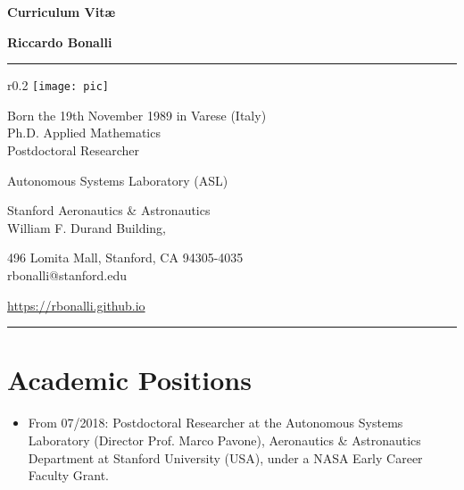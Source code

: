 \documentclass[a4paper,12pt]{article}
\begin{document}
\begingroup
\begin{center}
\LARGE \textbf{Curriculum Vit\ae}
\end{center}
\endgroup

\vspace{5pt}

\begingroup
\begin{center}
\large \textbf{Riccardo Bonalli}
\end{center}
\endgroup

\vspace{30pt}

\noindent\rule{18.5cm}{0.4pt}

\vspace{15pt}

\begin{wrapfigure}{r}{0.2\textwidth}
\centering
\hspace{-75pt}\texttt{[image: pic]}
\end{wrapfigure}

Born the 19th November 1989 in Varese (Italy) \\

Ph.D. Applied Mathematics \\

Postdoctoral Researcher

Autonomous Systems Laboratory (ASL)

Stanford Aeronautics \& Astronautics \\

William F. Durand Building,

496 Lomita Mall, Stanford, CA 94305-4035 \\

rbonalli@stanford.edu

\url{https://rbonalli.github.io}

\vspace{10pt}

\noindent\rule{18.5cm}{0.4pt}

\vspace{30pt}

\section{Academic Positions}
\begin{itemize}
\item From 07/2018: Postdoctoral Researcher at the Autonomous Systems Laboratory (Director Prof. Marco Pavone), Aeronautics \& Astronautics Department at Stanford University (USA), under a  NASA Early Career Faculty Grant.
\end{itemize}
\end{document}
